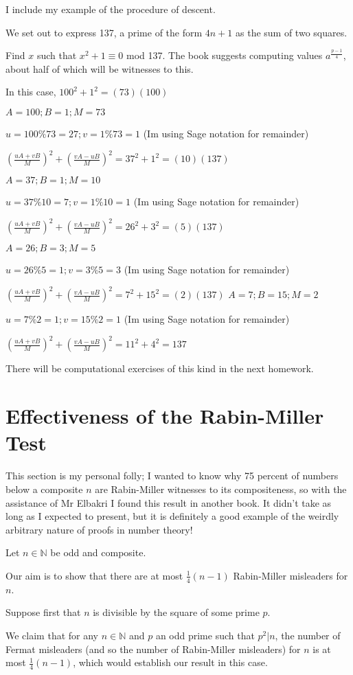 \documentclass[12pt]{article}
\begin{document}
I include my example of the procedure of descent.

We set out to express 137, a prime of the form $4n+1$ as the sum of two squares.

Find $x$ such that $x^2+1 \equiv 0$ mod 137.   The book suggests computing values $a^{\frac{p-1}4}$, about half of which will be witnesses to this.

In this case, $100^2+1^2 = (73)(100)$

$A=100; B=1; M=73$

$u=100\%73=27; v=1\%73=1$  (Im using Sage notation for remainder)

$(\frac{uA+vB}M)^2+(\frac{vA-uB}M)^2= 37^2+1^2=(10)(137)$

$A=37; B=1; M=10$

$u=37\%10=7; v=1\%10=1$  (Im using Sage notation for remainder)

$(\frac{uA+vB}M)^2+(\frac{vA-uB}M)^2= 26^2+3^2=(5)(137)$

$A=26; B=3; M=5$

$u=26\%5=1; v=3\%5=3$  (Im using Sage notation for remainder)

$(\frac{uA+vB}M)^2+(\frac{vA-uB}M)^2= 7^2+15^2=(2)(137)$
$A=7; B=15; M=2$

$u=7\%2=1; v=15\%2=1$  (Im using Sage notation for remainder)

$(\frac{uA+vB}M)^2+(\frac{vA-uB}M)^2= 11^2+4^2=137$

There will be computational exercises of this kind in the next homework.

\section{Effectiveness of the Rabin-Miller Test}

This section is my personal folly; I wanted to know why 75 percent of numbers below a composite $n$ are Rabin-Miller witnesses to its compositeness, so with the assistance of Mr Elbakri I found this result in another book.   It didn't take as long as I expected to present, but it is definitely a good example of the weirdly arbitrary nature of proofs in number theory!

Let $n \in {\mathbb N}$ be odd and composite.

Our aim is to show that there are at most $\frac14(n-1)$ Rabin-Miller misleaders for $n$.

Suppose first that $n$ is divisible by the square of some prime $p$.

We claim that for any $n \in {\mathbb N}$ and $p$  an odd prime such that $p^2 | n$, the number of Fermat misleaders (and so the number of Rabin-Miller misleaders) for $n$ is
at most $\frac 14(n-1)$, which would establish our result in this case.
\end{document}
